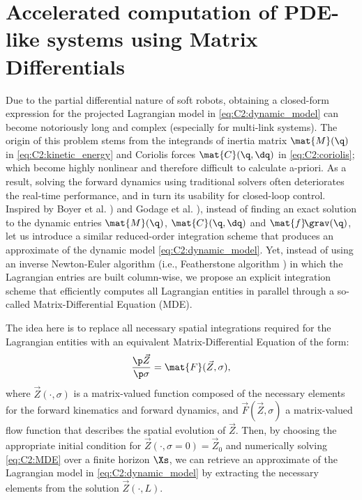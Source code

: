 \section[Accelerated computation of PDE-like systems]{Accelerated computation of PDE-like systems using Matrix Differentials}
\label{sec: chap2 section header}
Due to the partial differential nature of soft robots, obtaining a closed-form expression for the projected Lagrangian model in \eqref{eq:C2:dynamic_model} can become notoriously long and complex (especially for multi-link systems). The origin of this problem stems from the integrands of inertia matrix $\mat{M}(\q)$ in \eqref{eq:C2:kinetic_energy} and Coriolis forces $\mat{C}(\q,\dq)$ in \eqref{eq:C2:coriolis}; which become highly nonlinear and therefore difficult to calculate a-priori. As a result, solving the forward dynamics using traditional solvers often deteriorates the real-time performance, and in turn its usability for closed-loop control. Inspired by Boyer et al. \cite{Boyer2021}) and Godage et al. 
\cite{Godage2016}), instead of finding an exact solution to the dynamic entries $\mat{M}(\q)$, $\mat{C}(\q,\dq)$ and $\mat{f}\!\grav(\q)$, let us introduce a similar reduced-order integration scheme that produces an approximate of the dynamic model \eqref{eq:C2:dynamic_model}. Yet, \editl instead of using an inverse Newton-Euler algorithm (i.e., Featherstone algorithm \cite{Spong2006}) \editr in which the Lagrangian entries are built column-wise, we propose an explicit integration scheme that efficiently computes all Lagrangian entities in parallel through a so-called Matrix-Differential Equation (MDE).

The idea here is to replace all necessary spatial integrations required for the Lagrangian entities with an equivalent Matrix-Differential Equation of the form:
%
\begin{equation}
\frac{\p \vec{Z}}{\p \sigma} = \mat{F}(\vec{Z},\sigma), \label{eq:C2:MDE}
\end{equation}
%
where $\vec{Z}(\cdot,\sigma)$ is a matrix-valued function composed of the necessary elements for the forward kinematics and forward dynamics, and $\vec{F}(\vec{Z},\sigma)$ a matrix-valued flow function that describes the spatial evolution of $\vec{Z}$. Then, by choosing the appropriate initial condition for $\vec{Z}(\cdot,\sigma = 0) = \vec{Z}_0$ and numerically solving \eqref{eq:C2:MDE} over a finite horizon $\Xs$, we can retrieve an approximate of the Lagrangian model in
\eqref{eq:C2:dynamic_model} by extracting the necessary elements from the solution $\vec{Z}(\cdot,L)$.

